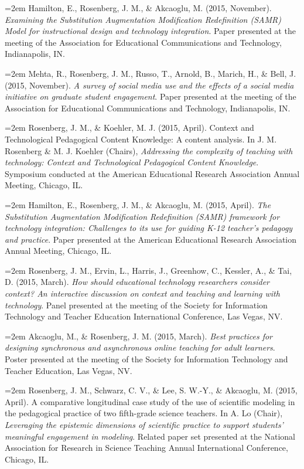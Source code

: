 \documentclass[
  14,
]{article}
\begin{document}
\hangindent=2em Hamilton, E., Rosenberg, J. M., \& Akcaoglu, M. (2015,
November). \emph{Examining the Substitution Augmentation Modification
Redefinition (SAMR) Model for instructional design and technology
integration}. Paper presented at the meeting of the Association for
Educational Communications and Technology, Indianapolis, IN.

\hangindent=2em Mehta, R., Rosenberg, J. M., Russo, T., Arnold, B.,
Marich, H., \& Bell, J. (2015, November). \emph{A survey of social media
use and the effects of a social media initiative on graduate student
engagement}. Paper presented at the meeting of the Association for
Educational Communications and Technology, Indianapolis, IN.

\hangindent=2em Rosenberg, J. M., \& Koehler, M. J. (2015, April).
Context and Technological Pedagogical Content Knowledge: A content
analysis. In J. M. Rosenberg \& M. J. Koehler (Chairs), \emph{Addressing
the complexity of teaching with technology: Context and Technological
Pedagogical Content Knowledge}. Symposium conducted at the American
Educational Research Association Annual Meeting, Chicago, IL.

\hangindent=2em Hamilton, E., Rosenberg, J. M., \& Akcaoglu, M. (2015,
April). \emph{The Substitution Augmentation Modification Redefinition
(SAMR) framework for technology integration: Challenges to its use for
guiding K-12 teacher's pedagogy and practice}. Paper presented at the
American Educational Research Association Annual Meeting, Chicago, IL.

\hangindent=2em Rosenberg, J. M., Ervin, L., Harris, J., Greenhow, C.,
Kessler, A., \& Tai, D. (2015, March). \emph{How should educational
technology researchers consider context? An interactive discussion on
context and teaching and learning with technology}. Panel presented at
the meeting of the Society for Information Technology and Teacher
Education International Conference, Las Vegas, NV.

\hangindent=2em Akcaoglu, M., \& Rosenberg, J. M. (2015, March).
\emph{Best practices for designing synchronous and asynchronous online
teaching for adult learners}. Poster presented at the meeting of the
Society for Information Technology and Teacher Education, Las Vegas, NV.

\hangindent=2em Rosenberg, J. M., Schwarz, C. V., \& Lee, S. W.-Y., \&
Akcaoglu, M. (2015, April). A comparative longitudinal case study of the
use of scientific modeling in the pedagogical practice of two
fifth-grade science teachers. In A. Lo (Chair), \emph{Leveraging the
epistemic dimensions of scientific practice to support students'
meaningful engagement in modeling}. Related paper set presented at the
National Association for Research in Science Teaching Annual
International Conference, Chicago, IL.
\end{document}
